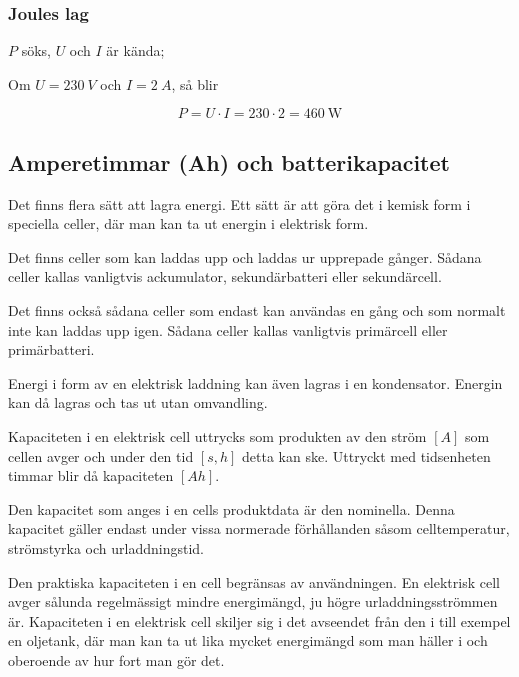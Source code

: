 \subsubsection{Joules lag}

\(P\) söks, \(U\) och \(I\) är kända;

Om \(U = \SI{230}{V} \) och \(I = \SI{2}{A} \), så blir

\begin{equation*}
  P = U \cdot I = 230 \cdot 2 = \SI{460}{\watt}
\end{equation*}

\subsection{Amperetimmar (Ah) och batterikapacitet}

Det finns flera sätt att lagra energi.
Ett sätt är att göra det i kemisk form i speciella celler, där man kan ta ut
energin i elektrisk form.

Det finns celler som kan laddas upp och laddas ur upprepade gånger.
Sådana celler kallas vanligtvis ackumulator, sekundärbatteri eller
sekundärcell.

Det finns också sådana celler som endast kan användas en gång och som normalt
inte kan laddas upp igen.
Sådana celler kallas vanligtvis primärcell eller primärbatteri.

Energi i form av en elektrisk laddning kan även lagras i en kondensator.
Energin kan då lagras och tas ut utan omvandling.

Kapaciteten i en elektrisk cell uttrycks som produkten av den ström
\(\unit{[A]}\) som cellen avger och under den tid \(\unit{[s, h]}\) detta
kan ske.
Uttryckt med tidsenheten timmar blir då kapaciteten \(\unit{[Ah]}\).

Den kapacitet som anges i en cells produktdata är den nominella.
Denna kapacitet gäller endast under vissa normerade förhållanden såsom
celltemperatur, strömstyrka och urladdningstid.

Den praktiska kapaciteten i en cell begränsas av användningen.
En elektrisk cell avger sålunda regelmässigt mindre energimängd, ju högre
urladdningsströmmen är.
Kapaciteten i en elektrisk cell skiljer sig i det avseendet från den i
till exempel en oljetank, där man kan ta ut lika mycket energimängd som man häller i
och oberoende av hur fort man gör det.

